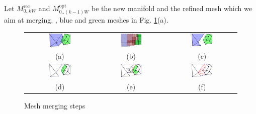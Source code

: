 Let $\mathit{M}_{0..kW}^{\text{rec}}$ and  $\mathit{M}_{0..(k-1)W}^{\text{opt}}$ be the new manifold and the refined mesh which we aim at merging, \eg, blue and green meshes in Fig. \ref{fig:mesh_merging}(a).


\begin{figure}[t]
\centering
\setlength{\tabcolsep}{1px}
\begin{tabular}{ccc}
\includegraphics[width=0.325\textwidth]{./img/ch-incr-dens/meshmerge01}&
\includegraphics[width=0.325\textwidth]{./img/ch-incr-dens/meshmerge03}&
\includegraphics[width=0.325\textwidth]{./img/ch-incr-dens/meshmerge04}\\
(a)&(b)&(c)\\
\includegraphics[width=0.325\textwidth]{./img/ch-incr-dens/meshmerge07}&
\includegraphics[width=0.325\textwidth]{./img/ch-incr-dens/meshmerge09}&
\includegraphics[width=0.325\textwidth]{./img/ch-incr-dens/meshmerge11}\\
(d)&(e)&(f)\\
\end{tabular}
\caption{Mesh merging steps}
\label{fig:mesh_merging}
\end{figure}
